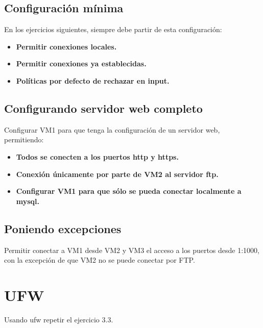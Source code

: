 \documentclass[12pt,letterpaper]{article}
\begin{document}
\subsection{Configuración mínima}
En los ejercicios siguientes, siempre debe partir de esta configuración:
\begin{itemize}
	\item \textbf{Permitir conexiones locales.}
	\item \textbf{Permitir conexiones ya establecidas.}
	\item \textbf{Políticas por defecto de rechazar en input.}
\end{itemize}

\subsection{Configurando servidor web completo}
Configurar VM1 para que tenga la configuración de un servidor web, permitiendo:
\begin{itemize}
	\item \textbf{Todos se conecten a los puertos http y https.}
	\item \textbf{Conexión únicamente por parte de VM2 al servidor ftp.}
	\item \textbf{Configurar VM1 para que sólo se pueda conectar localmente a mysql.}
\end{itemize}

\subsection{Poniendo excepciones}
Permitir conectar a VM1 desde VM2 y VM3 el acceso a los puertos desde 1:1000, con la excepción de que VM2 no se puede conectar por FTP.


\section{UFW}
Usando ufw repetir el ejercicio 3.3.
\end{document}
